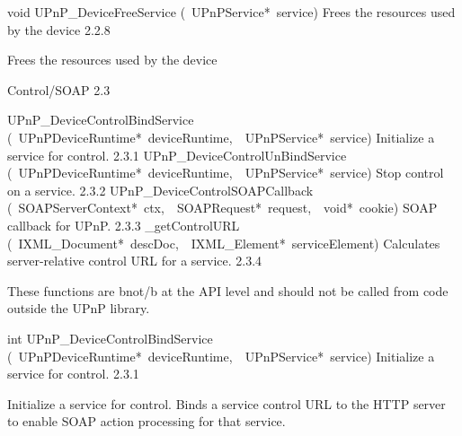 \documentclass{article}
\begin{document}
\begin{cxxentry}
\begin{cxxentry}
\begin{cxxfunction}
\begin{cxxdoc}
\end{cxxdoc}
\end{cxxfunction}
\begin{cxxfunction}
{void}
        {UPnP\_DeviceFreeService}
        {(\ UPnPService*\ service)}
        {Frees the resources used by the device}
        {2.2.8}
\begin{cxxdoc}
Frees the resources used by the device


\end{cxxdoc}
\end{cxxfunction}
\end{cxxentry}
\begin{cxxentry}
{}
        {Control/SOAP}
        {}
        {}
        {2.3}
\begin{cxxnames}
        {UPnP\_DeviceControlBindService}
        {(\ UPnPDeviceRuntime*\ deviceRuntime,\ \ UPnPService*\ service)}
        {Initialize a service for control.}
        {2.3.1}
        {UPnP\_DeviceControlUnBindService}
        {(\ UPnPDeviceRuntime*\ deviceRuntime,\ \ UPnPService*\ service)}
        {Stop control on a service.}
        {2.3.2}
        {UPnP\_DeviceControlSOAPCallback}
        {(\ SOAPServerContext*\ ctx,\ \ SOAPRequest*\ request,\ \ void*\ cookie)}
        {SOAP callback for UPnP.}
        {2.3.3}
        {\_getControlURL}
        {(\ IXML\_Document*\ descDoc,\ \ IXML\_Element*\ serviceElement)}
        {Calculates server-relative control URL for a service.}
        {2.3.4}
\end{cxxnames}
\begin{cxxdoc}
These functions are \<b\>not\</b\> at the API level and should not be called from
code outside the UPnP library. 
\end{cxxdoc}
\begin{cxxfunction}
{int}
        {UPnP\_DeviceControlBindService}
        {(\ UPnPDeviceRuntime*\ deviceRuntime,\ \ UPnPService*\ service)}
        {Initialize a service for control.}
        {2.3.1}
\begin{cxxdoc}
Initialize a service for control. Binds a service control URL to the
HTTP server to enable SOAP action processing for that service.



\end{cxxdoc}
\end{cxxfunction}
\end{cxxentry}
\end{cxxentry}
\end{document}
